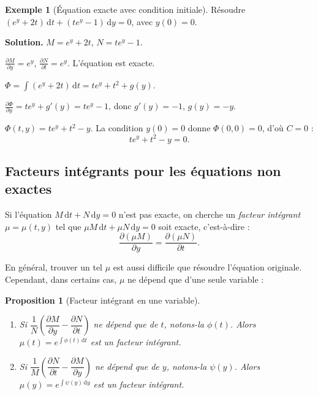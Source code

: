 \documentclass[12pt,a4paper,openany]{book}
\theoremstyle{definition}
\newtheorem{exemple}[definition]{Exemple}
\theoremstyle{plain}
\newtheorem{proposition}[definition]{Proposition}
\theoremstyle{remark}
\newcommand{\dd}{\mathrm{d}}
\begin{document}
\begin{exemple}[Équation exacte avec condition initiale]
\label{ex:exacte-2}
Résoudre $(e^y + 2t)\,\dd t + (te^y - 1)\,\dd y = 0$, avec $y(0) = 0$.

\textbf{Solution.} $M = e^y + 2t$, $N = te^y - 1$.

$\frac{\partial M}{\partial y} = e^y$, $\frac{\partial N}{\partial t} = e^y$. L'équation est exacte.

$\Phi = \int (e^y + 2t)\,\dd t = te^y + t^2 + g(y)$.

$\frac{\partial \Phi}{\partial y} = te^y + g'(y) = te^y - 1$, donc $g'(y) = -1$, $g(y) = -y$.

$\Phi(t,y) = te^y + t^2 - y$. La condition $y(0) = 0$ donne $\Phi(0,0) = 0$, d'où $C = 0$ :
\[
\boxed{te^y + t^2 - y = 0.}
\]
\end{exemple}

\subsection{Facteurs intégrants pour les équations non exactes}
\label{subsec:facteurs-integrants}

Si l'équation $M\,\dd t + N\,\dd y = 0$ n'est pas exacte, on cherche un \emph{facteur intégrant} $\mu = \mu(t,y)$ tel que $\mu M\,\dd t + \mu N\,\dd y = 0$ soit exacte, c'est-à-dire :
\[
\frac{\partial(\mu M)}{\partial y} = \frac{\partial(\mu N)}{\partial t}.
\]

En général, trouver un tel $\mu$ est aussi difficile que résoudre l'équation originale. Cependant, dans certains cas, $\mu$ ne dépend que d'une seule variable :

\begin{proposition}[Facteur intégrant en une variable]
\label{prop:facteur-integrant}
\begin{enumerate}[label=(\roman*)]
\item Si $\dfrac{1}{N}\!\left(\dfrac{\partial M}{\partial y} - \dfrac{\partial N}{\partial t}\right)$ ne dépend que de $t$, notons-la $\phi(t)$. Alors $\mu(t) = e^{\int \phi(t)\,\dd t}$ est un facteur intégrant.
\item Si $\dfrac{1}{M}\!\left(\dfrac{\partial N}{\partial t} - \dfrac{\partial M}{\partial y}\right)$ ne dépend que de $y$, notons-la $\psi(y)$. Alors $\mu(y) = e^{\int \psi(y)\,\dd y}$ est un facteur intégrant.
\end{enumerate}
\end{proposition}
\end{document}
